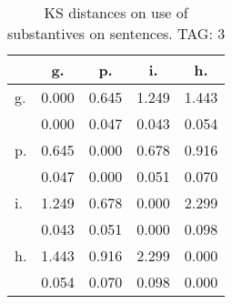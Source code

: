 \begin{table}[h!]
\begin{center}
\begin{tabular}{| l | c | c | c | c |}\hline
 & g. & p. & i. & h. \\\hline
g. & 0.000  & 0.645  & 1.249  & 1.443 \\\hline
 & 0.000  & 0.047  & 0.043  & 0.054 \\\hline
p. & 0.645  & 0.000  & 0.678  & 0.916 \\\hline
 & 0.047  & 0.000  & 0.051  & 0.070 \\\hline
i. & 1.249  & 0.678  & 0.000  & 2.299 \\\hline
 & 0.043  & 0.051  & 0.000  & 0.098 \\\hline
h. & 1.443  & 0.916  & 2.299  & 0.000 \\\hline
 & 0.054  & 0.070  & 0.098  & 0.000 \\\hline
\end{tabular}
\caption{KS distances on use of substantives on sentences. TAG: 3}
\end{center}
\end{table}